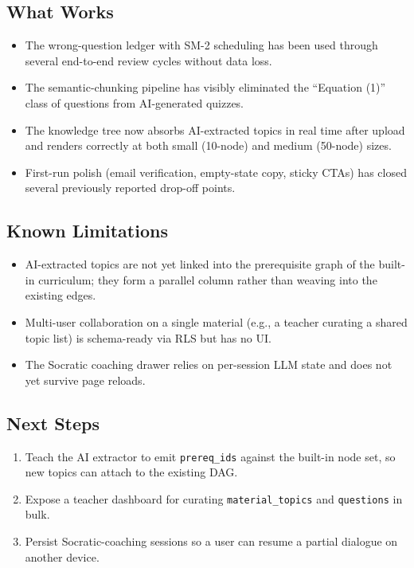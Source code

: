\documentclass[11pt,a4paper]{article}
\newcommand{\code}[1]{\texttt{\small #1}}
\begin{document}
\subsection{What Works}

\begin{itemize}
    \item The wrong-question ledger with SM-2 scheduling has been used through several end-to-end review cycles without data loss.
    \item The semantic-chunking pipeline has visibly eliminated the ``Equation (1)'' class of questions from AI-generated quizzes.
    \item The knowledge tree now absorbs AI-extracted topics in real time after upload and renders correctly at both small (10-node) and medium (50-node) sizes.
    \item First-run polish (email verification, empty-state copy, sticky CTAs) has closed several previously reported drop-off points.
\end{itemize}

\subsection{Known Limitations}

\begin{itemize}
    \item AI-extracted topics are not yet linked into the prerequisite graph of the built-in curriculum; they form a parallel column rather than weaving into the existing edges.
    \item Multi-user collaboration on a single material (e.g., a teacher curating a shared topic list) is schema-ready via RLS but has no UI.
    \item The Socratic coaching drawer relies on per-session LLM state and does not yet survive page reloads.
\end{itemize}

\subsection{Next Steps}

\begin{enumerate}[leftmargin=*]
    \item Teach the AI extractor to emit \code{prereq\_ids} against the built-in node set, so new topics can attach to the existing DAG.
    \item Expose a teacher dashboard for curating \code{material\_topics} and \code{questions} in bulk.
    \item Persist Socratic-coaching sessions so a user can resume a partial dialogue on another device.
\end{enumerate}
\end{document}
